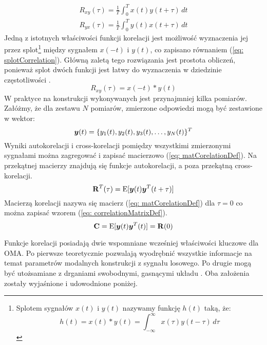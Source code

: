 \begin{equation} \label{eq: timeAveCrosscorrelation}
	\begin{aligned}
		R_{xy}(\tau) = \frac{1}{T}\int_{0}^{T}x(t)y(t+\tau) \,dt \\
		R_{yx}(\tau) = \frac{1}{T}\int_{0}^{T}y(t)x(t+\tau) \,dt 
	\end{aligned}
\end{equation}
Jedną z istotnych właściwości funkcji korelacji jest możliwość wyznaczenia jej przez splot\footnote{
 Splotem sygnałów $x(t)$ i $y(t)$ nazywamy funkcję $h(t)$ taką, że:
 \begin{equation*} 
 	h(t)=x(t)*y(t)=\int_{-\infty}^{\infty}x(\tau)y(t-\tau) \,d\tau
 \end{equation*} 
} między sygnałem $x(-t)$ i $y(t)$, co zapisano równaniem (\ref{eq: splotCorrelation}). Główną zaletą tego rozwiązania jest prostota obliczeń, ponieważ splot dwóch funkcji jest łatwy do wyznaczenia w dziedzinie częstotliwości \parencite{Brincker2015}.
\begin{equation} \label{eq: splotCorrelation}
	R_{xy}(\tau)=x(-t)*y(t)
\end{equation}
W praktyce na konstrukcji wykonywanych jest przynajmniej kilka pomiarów. Załóżmy, że dla zestawu $N$ pomiarów, zmierzone odpowiedzi mogą być zestawione w wektor:
\begin{equation}
	\bm{y}(t) = \{y_1(t),y_2(t),y_3(t), \hdots ,y_N(t)\}^T
\end{equation}
Wyniki autokorelacji i cross-korelacji pomiędzy wszystkimi zmierzonymi sygnałami można zagregować i zapisać macierzowo (\ref{eq: matCorelationDef}). Na przekątnej macierzy znajdują się funkcje autokorelacji, a poza przekątną cross-korelacji.
\begin{equation} \label{eq: matCorelationDef}
	\mathbf{R}^T(\tau)=\mathrm{E}[\bm{y}(t)\bm{y}^T(t+\tau)]
\end{equation}
Macierzą korelacji  nazywa się macierz (\ref{eq: matCorelationDef}) dla $\tau=0$ co można zapisać wzorem (\ref{eq: correlationMatrixDef}).
\begin{equation} \label{eq: correlationMatrixDef}
	\mathbf{C}=\mathrm{E}[\bm{y}(t)\bm{y}^T(t)]=\mathbf{R}(0)
\end{equation}

Funkcje korelacji posiadają dwie wspomniane wcześniej właściwości kluczowe dla OMA. Po pierwsze teoretycznie pozwalają wyodrębnić wszystkie informacje na temat parametrów modalnych konstrukcji z sygnału losowego. Po drugie mogą być utożsamiane z drganiami swobodnymi, gasnącymi układu \parencite{James1995}. Oba założenia zostały wyjaśnione i udowodnione poniżej.

